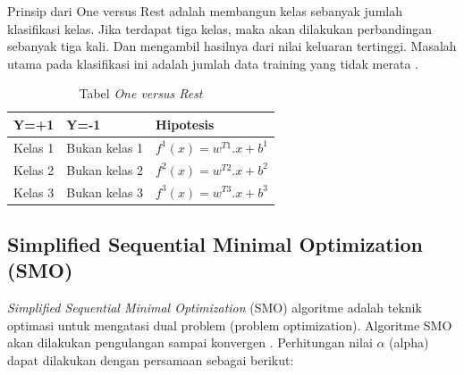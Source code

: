 Prinsip dari One versus Rest adalah membangun kelas sebanyak jumlah klasifikasi kelas. Jika terdapat tiga kelas, maka akan dilakukan perbandingan sebanyak tiga kali. Dan mengambil hasilnya dari nilai keluaran tertinggi. Masalah utama pada klasifikasi ini adalah jumlah data training yang tidak merata \cite{17}. 
\begin{table}[H]
	\caption{Tabel \textit{One versus Rest}}
	\centering
	\small
	\begin{adjustbox}{width=1\textwidth}
	\begin{tabular}{|p{4cm}|p{4cm}|p{4.5cm}|}
		\hline
		\textbf{Y=+1} & \textbf{Y=-1} & \textbf{Hipotesis}\\
		\hline
		Kelas 1 & Bukan kelas 1 &
		$f^1(x)=w^{T1}.x+b^1$\\
		\hline
		Kelas 2 & Bukan kelas 2 &
		$f^2(x)=w^{T2}.x+b^2$\\
		\hline
		Kelas 3 & Bukan kelas 3 &
		$f^3(x)=w^{T3}.x+b^3$\\
		\hline
	\end{tabular}
	\end{adjustbox}
\end{table}
\pagebreak
\subsection{Simplified Sequential Minimal Optimization (SMO)}
\textit{Simplified Sequential Minimal Optimization} (SMO) algoritme adalah teknik optimasi untuk mengatasi dual problem (problem optimization). Algoritme SMO akan dilakukan pengulangan sampai konvergen \cite{18}.
Perhitungan nilai $\alpha$ (alpha) dapat dilakukan dengan persamaan sebagai berikut:

